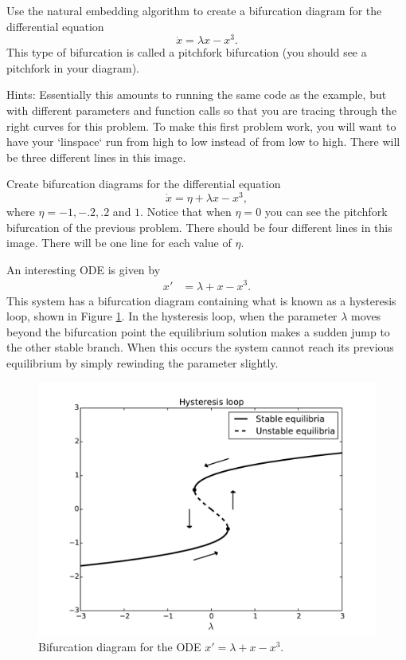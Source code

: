 \begin{problem}
Use the natural embedding algorithm to create a bifurcation diagram for the differential equation
\[\dot{x} = \lambda x-x^3.\]
This type of bifurcation is called a pitchfork bifurcation (you should see a pitchfork in your diagram).

Hints: Essentially this amounts to running the same code as the example, but with different parameters and function calls so that you are tracing through the right curves for this problem.
To make this first problem work, you will want to have your `linspace` run from high to low instead of from low to high.
There will be three different lines in this image.
\end{problem}

\begin{problem}
Create bifurcation diagrams for the differential equation
\[\dot{x} = \eta + \lambda x-x^3,\]
where $\eta = -1, -.2, .2$ and $1.$  Notice that when $\eta = 0$ you can see the pitchfork bifurcation of the previous problem.
There should be four different lines in this image.
There will be one line for each value of $\eta$.
\end{problem}

An interesting ODE is given by 
\begin{align*}
	x' &= \lambda + x - x^3.
\end{align*}
This system has a bifurcation diagram containing what is known as a hysteresis loop, shown in Figure \ref{bifurcation:hysteresis}.
In the hysteresis loop, when the parameter $\lambda$ moves beyond the bifurcation point the equilibrium solution makes a sudden jump to the other stable branch.
When this occurs the system cannot reach its previous equilibrium by simply rewinding the parameter slightly. 

\begin{figure}
\centering
\includegraphics[width=\textwidth]{HysteresisBifurcation.pdf}
\caption{Bifurcation diagram for the ODE $x' = \lambda + x - x^3$. }
\label{bifurcation:hysteresis}
\end{figure}

